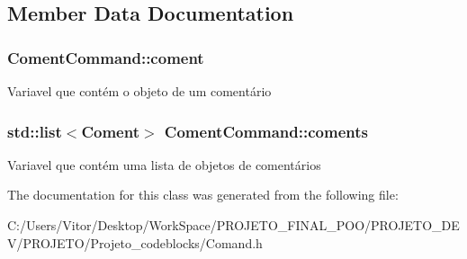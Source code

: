 \subsection{Member Data Documentation}
\hypertarget{class_coment_command_aeeadc825656bf9e76ce0ea3f721749e0}{
\subsubsection[{coment}]{ Coment\-Command\-::coment\hspace{0.3cm}{\ttfamily [protected]}}}\label{class_coment_command_aeeadc825656bf9e76ce0ea3f721749e0}
Variavel que contém o objeto de um comentário \hypertarget{class_coment_command_ad0ae90b7aacb5dc53857351855845488}{
\subsubsection[{coments}]{\setlength{\rightskip}{0pt plus 5cm}std\-::list$<${\bf Coment}$>$ Coment\-Command\-::coments\hspace{0.3cm}{\ttfamily [protected]}}}\label{class_coment_command_ad0ae90b7aacb5dc53857351855845488}
Variavel que contém uma lista de objetos de comentários 

The documentation for this class was generated from the following file\-:\begin{DoxyCompactItemize}
\item 
C\-:/\-Users/\-Vitor/\-Desktop/\-Work\-Space/\-P\-R\-O\-J\-E\-T\-O\-\_\-\-F\-I\-N\-A\-L\-\_\-\-P\-O\-O/\-P\-R\-O\-J\-E\-T\-O\-\_\-\-D\-E\-V/\-P\-R\-O\-J\-E\-T\-O/\-Projeto\-\_\-codeblocks/Comand.\-h\end{DoxyCompactItemize}
